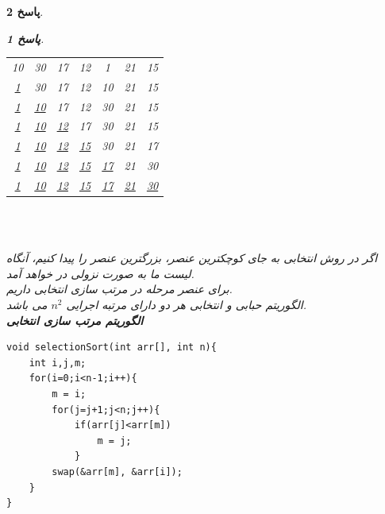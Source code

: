 \documentclass[12pt]{article}
\newtheorem{answer}{پاسخ}[section]
\begin{document}
\begin{answer}
\begin{answer}
\begin{latin}
\centering
\begin{tabular}{c c c c c c c}
10 & 30 & 17 & 12 & 1 & 21 & 15\\
\underline{1} & 30 & 17 & 12 & 10 & 21 & 15\\
\underline{1} & \underline{10} & 17 & 12 & 30 & 21 & 15\\
\underline{1} & \underline{10} & \underline{12} & 17 & 30 & 21 & 15\\
\underline{1} & \underline{10} & \underline{12} & \underline{15} & 30 & 21 & 17\\
\underline{1} & \underline{10} & \underline{12} & \underline{15}& \underline{17} & 21 & 30\\
\underline{1} & \underline{10} & \underline{12} & \underline{15}& \underline{17} & \underline{21} & \underline{30}\\
\end{tabular}\\
\end{latin}\\

\newline
اگر در روش انتخابی به جای کوچکترین عنصر، بزرگترین عنصر را پیدا کنیم، آنگاه لیست ما به صورت نزولی در خواهد آمد.\\
برای  عنصر  مرحله در مرتب سازی انتخابی داریم.\\
الگوریتم حبابی و انتخابی هر دو دارای مرتبه اجرایی $n^2$
می باشد.\\
\newpage
\textbf{الگوریتم مرتب سازی انتخابی}
\begin{flushright}
\begin{latin}
\begin{lstlisting}
void selectionSort(int arr[], int n){
	int i,j,m;
	for(i=0;i<n-1;i++){
		m = i;
		for(j=j+1;j<n;j++){
			if(arr[j]<arr[m])	
				m = j;
			}
		swap(&arr[m], &arr[i]);	
	}
}
\end{lstlisting}
\end{latin}
\end{flushright}


\end{answer}
\end{answer}
\end{document}
